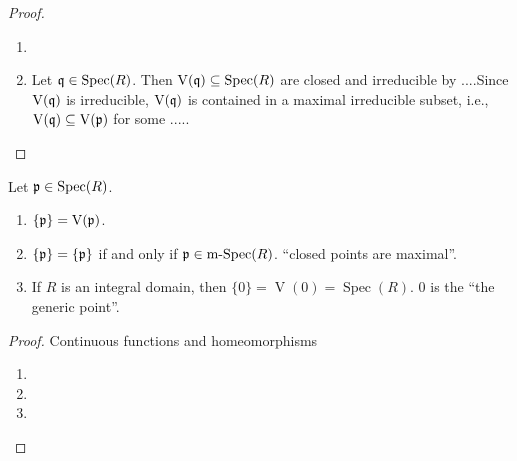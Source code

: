 \begin{proof}
    \begin{enumerate}
        \item 
        \item Let $\mathfrak{q} \in \operatorname{Spec}(R)$. Then $\operatorname{V}(\mathfrak{q}) \subseteq \operatorname{Spec}(R)$ are closed and irreducible by ....Since $\operatorname{V}(\mathfrak{q})$ is irreducible, $\operatorname{V}(\mathfrak{q})$ is contained in a maximal irreducible subset, i.e., $\operatorname{V}(\mathfrak{q}) \subseteq \operatorname{V}(\mathfrak{p})$ for some .....
    \end{enumerate}
\end{proof}

\begin{proposition}
    Let $\mathfrak{p} \in \operatorname{Spec}(R)$.
    \begin{enumerate}
        \item $\{\mathfrak{p}\} = \operatorname{V}(\mathfrak{p})$.
        \item $\{\mathfrak{p}\} = \{\mathfrak{p}\}$ if and only if $\mathfrak{p} \in \operatorname{m-Spec}(R)$. ``closed points are maximal''.
        \item If $R$ is an integral domain, then $\{0\} = \operatorname{V}(0) = \operatorname{Spec}(R)$. 0 is the ``the generic point''.
    \end{enumerate}
\end{proposition}

\begin{proof}
    Continuous functions and homeomorphisms\begin{enumerate}
        \item 
        \item 
        \item 
    \end{enumerate}
\end{proof}
